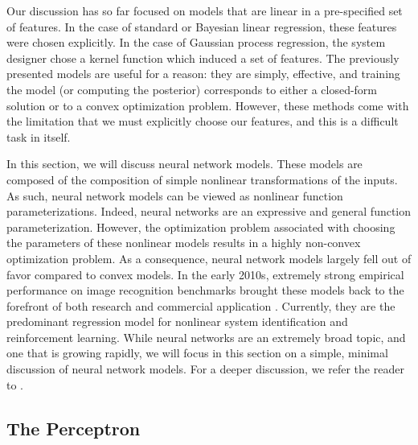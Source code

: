 Our discussion has so far focused on models that are linear in a pre-specified set of features. In the case of standard or Bayesian linear regression, these features were chosen explicitly. In the case of Gaussian process regression, the system designer chose a kernel function which induced a set of features. The previously presented models are useful for a reason: they are simply, effective, and training the model (or computing the posterior) corresponds to either a closed-form solution or to a convex optimization problem. However, these methods come with the limitation that we must explicitly choose our features, and this is a difficult task in itself. 

In this section, we will discuss neural network models. These models are composed of the composition of simple nonlinear transformations of the inputs. As such, neural network models can be viewed as nonlinear function parameterizations. Indeed, neural networks are an expressive and general function parameterization. However, the optimization problem associated with choosing the parameters of these nonlinear models results in a highly non-convex optimization problem. As a consequence, neural network models largely fell out of favor compared to convex  models. In the early 2010s, extremely strong empirical performance on image recognition benchmarks brought these models back to the forefront of both research and commercial application \cite{krizhevsky2012imagenet}. Currently, they are the predominant regression model for nonlinear system identification and reinforcement learning. While neural networks are an extremely broad topic, and one that is growing rapidly, we will focus in this section on a simple, minimal discussion of neural network models. For a deeper discussion, we refer the reader to \cite{goodfellow2016deep}.

\subsection{The Perceptron}


